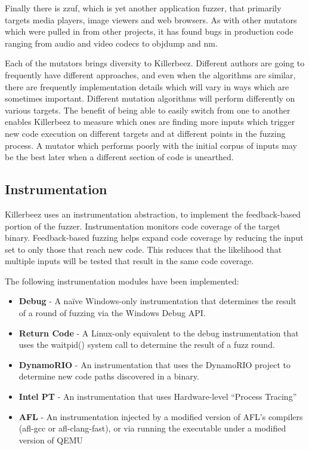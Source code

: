 Finally there is zzuf, which is yet another application fuzzer, that
primarily targets media players, image viewers and web browsers.  As with
other mutators which were pulled in from other projects, it has found bugs in
production code ranging from audio and video codecs to objdump and nm.

Each of the mutators brings diversity to Killerbeez.  Different authors are
going to frequently have different approaches, and even when the algorithms
are similar, there are frequently implementation details which will vary in
ways which are sometimes important.  Different mutation algorithms will
perform differently on various targets.  The benefit of being able to easily
switch from one to another enables Killerbeez to measure which ones are finding
more inputs which trigger new code execution on different targets and at different points in
the fuzzing process.  A mutator which performs poorly with the initial corpus
of inputs may be the best later when a different section of code is unearthed.

\subsection{Instrumentation} \label{Instrumentation}
Killerbeez uses an instrumentation abstraction, to implement the
feedback-based portion of the fuzzer. Instrumentation monitors code coverage of
the target binary. Feedback-based fuzzing helps expand code
coverage by reducing the input set to only those that reach new code.
This reduces that the likelihood that multiple inputs will be tested that result
in the same code coverage.

The following instrumentation modules have been implemented:
\begin{itemize}[noitemsep]
\item \textbf{Debug} - A na\"ive Windows-only instrumentation that determines the
	result of a round of fuzzing via the Windows Debug API.
\item \textbf{Return Code} - A Linux-only equivalent to the debug instrumentation that
	uses the waitpid() system call to determine the result of a fuzz round.
\item \textbf{DynamoRIO} - An instrumentation that uses the DynamoRIO project\cite{dynamo} to
	determine new code paths discovered in a binary.
\item \textbf{Intel PT} - An instrumentation that uses Hardware-level ``Process Tracing''
\item \textbf{AFL} - An instrumentation injected by a modified version of AFL's compilers (afl-gcc or
	afl-clang-fast), or via running the executable under a modified version of QEMU\cite{qemu}
\end{itemize}

